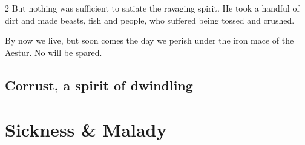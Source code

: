 \documentclass{osr-template/zine}
\renewcommand\zinetitle{The Odd}
\begin{document}
\begin{multicols*}{2}
But nothing was sufficient to satiate the ravaging spirit. He took a handful of dirt and made beasts, fish and people, who suffered being tossed and crushed.

By now we live, but soon comes the day we perish under the iron mace of the Aestur. No will be spared.

\newpage

\subsection*{Corrust, a spirit of dwindling}

\lipsum[7-8]

\end{multicols*}

\renewcommand\zinetitle{Appendix}


\newpage
\section*{\centering \fontsize{35}{45}\selectfont Sickness \& Malady}
\vspace*{0.4 cm}
\end{document}
